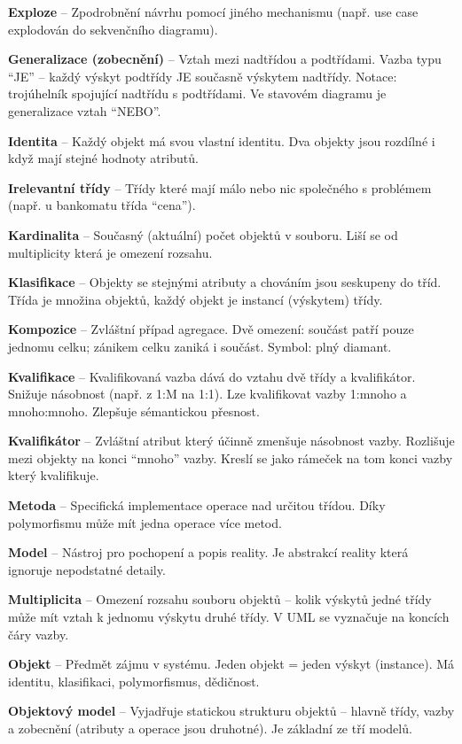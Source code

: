 \documentclass[12pt, a4paper]{article}
\begin{document}
\textbf{Exploze} -- Zpodrobnění návrhu pomocí jiného mechanismu (např. use case explodován do sekvenčního diagramu).

\textbf{Generalizace (zobecnění)} -- Vztah mezi nadtřídou a podtřídami. Vazba typu ``JE'' -- každý výskyt podtřídy JE současně výskytem nadtřídy. Notace: trojúhelník spojující nadtřídu s podtřídami. Ve stavovém diagramu je generalizace vztah ``NEBO''.

\textbf{Identita} -- Každý objekt má svou vlastní identitu. Dva objekty jsou rozdílné i když mají stejné hodnoty atributů.

\textbf{Irelevantní třídy} -- Třídy které mají málo nebo nic společného s problémem (např. u bankomatu třída ``cena'').

\textbf{Kardinalita} -- Současný (aktuální) počet objektů v souboru. Liší se od multiplicity která je omezení rozsahu.

\textbf{Klasifikace} -- Objekty se stejnými atributy a chováním jsou seskupeny do tříd. Třída je množina objektů, každý objekt je instancí (výskytem) třídy.

\textbf{Kompozice} -- Zvláštní případ agregace. Dvě omezení: součást patří pouze jednomu celku; zánikem celku zaniká i součást. Symbol: plný diamant.

\textbf{Kvalifikace} -- Kvalifikovaná vazba dává do vztahu dvě třídy a kvalifikátor. Snižuje násobnost (např. z 1:M na 1:1). Lze kvalifikovat vazby 1:mnoho a mnoho:mnoho. Zlepšuje sémantickou přesnost.

\textbf{Kvalifikátor} -- Zvláštní atribut který účinně zmenšuje násobnost vazby. Rozlišuje mezi objekty na konci ``mnoho'' vazby. Kreslí se jako rámeček na tom konci vazby který kvalifikuje.

\textbf{Metoda} -- Specifická implementace operace nad určitou třídou. Díky polymorfismu může mít jedna operace více metod.

\textbf{Model} -- Nástroj pro pochopení a popis reality. Je abstrakcí reality která ignoruje nepodstatné detaily.

\textbf{Multiplicita} -- Omezení rozsahu souboru objektů -- kolik výskytů jedné třídy může mít vztah k jednomu výskytu druhé třídy. V UML se vyznačuje na koncích čáry vazby.

\textbf{Objekt} -- Předmět zájmu v systému. Jeden objekt = jeden výskyt (instance). Má identitu, klasifikaci, polymorfismus, dědičnost.

\textbf{Objektový model} -- Vyjadřuje statickou strukturu objektů -- hlavně třídy, vazby a zobecnění (atributy a operace jsou druhotné). Je základní ze tří modelů.
\end{document}
